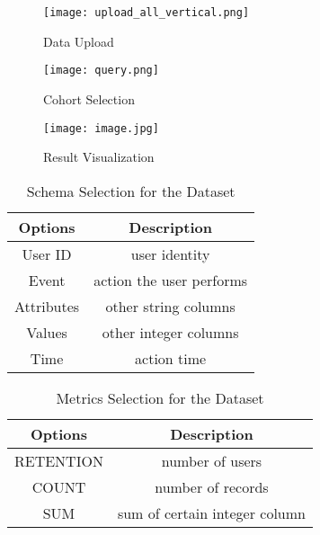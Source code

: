 \begin{figure*}
\begin{minipage}{0.3\textwidth}
    \centering
    \texttt{[image: upload\_all\_vertical.png]}
    \caption{Data Upload}
    \label{fig:upload}
\end{minipage}
\begin{minipage}{0.38\textwidth}
    \texttt{[image: query.png]}
    \caption{Cohort Selection}
    \label{fig:cohort}
\end{minipage}
\begin{minipage}{0.3\textwidth}
    \texttt{[image: image.jpg]}
    \caption{Result Visualization}
    \label{fig:visual}
\end{minipage}

\end{figure*}

\begin{table}[tb!]
\begin{center}
    \begin{tabular}{ |c|c| }
        \hline
        Options & Description \\[0.5ex] 
        \hline\hline
        User ID & user identity \\
        \hline
        Event & action the user performs\\
        \hline
        Attributes & other string columns\\
        \hline
        Values & other integer columns\\
        \hline
        Time & action time \\
        \hline
    \end{tabular}
\end{center}
\caption{Schema Selection for the Dataset}
\label{table:schema}
\end{table}

\begin{table}[tb!]
\begin{center}
    \begin{tabular}{ | c | c | }
        \hline
        Options & Description \\[0.5ex] 
        \hline\hline
        RETENTION & number of users \\
        \hline
        COUNT & number of records \\
        \hline
        SUM & sum of certain integer column \\
        \hline
    \end{tabular}
\end{center}
\caption{Metrics Selection for the Dataset}
\label{table:metrics}
\end{table}

